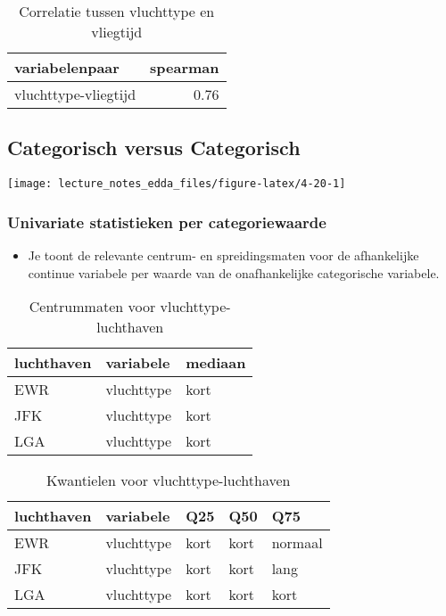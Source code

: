 \documentclass[]{memoir}
\providecommand{\tightlist}{%
  \setlength{\itemsep}{0pt}\setlength{\parskip}{0pt}}
\begin{document}
\begin{table}[t]

\caption{\label{tab:unnamed-chunk-1}Correlatie tussen vluchttype en vliegtijd}
\centering
\fontsize{10}{12}\selectfont
\begin{tabular}{lr}
\toprule
variabelenpaar & spearman\\
\midrule
vluchttype-vliegtijd & 0.76\\
\bottomrule
\end{tabular}
\end{table}

\subsection{Categorisch versus
Categorisch}\label{categorisch-versus-categorisch}

\texttt{[image: lecture\_notes\_edda\_files/figure-latex/4-20-1]}

\subsubsection*{Univariate statistieken per
categoriewaarde}\label{univariate-statistieken-per-categoriewaarde-1}

\begin{itemize}
\tightlist
\item
  Je toont de relevante centrum- en spreidingsmaten voor de afhankelijke
  continue variabele per waarde van de onafhankelijke categorische
  variabele.
\end{itemize}

\begin{table}[t]

\caption{\label{tab:unnamed-chunk-2}Centrummaten voor vluchttype-luchthaven}
\centering
\fontsize{10}{12}\selectfont
\begin{tabular}{lll}
\toprule
luchthaven & variabele & mediaan\\
\midrule
EWR & vluchttype & kort\\
JFK & vluchttype & kort\\
LGA & vluchttype & kort\\
\bottomrule
\end{tabular}
\end{table}

\begin{table}[t]

\caption{\label{tab:unnamed-chunk-3}Kwantielen voor vluchttype-luchthaven}
\centering
\fontsize{10}{12}\selectfont
\begin{tabular}{lllll}
\toprule
luchthaven & variabele & Q25 & Q50 & Q75\\
\midrule
EWR & vluchttype & kort & kort & normaal\\
JFK & vluchttype & kort & kort & lang\\
LGA & vluchttype & kort & kort & kort\\
\bottomrule
\end{tabular}
\end{table}
\end{document}
